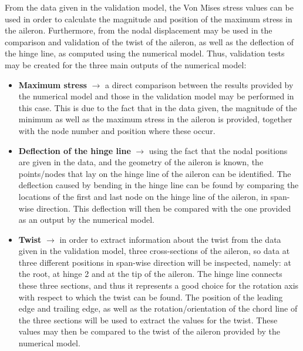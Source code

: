 From the data given in the validation model, the Von Mises stress values can be used in order to calculate the magnitude and position of the maximum stress in the aileron. Furthermore, from the nodal displacement may be used in the comparison and validation of the twist of the aileron, as well as the deflection of the hinge line, as computed using the numerical model. Thus, validation tests may be created for the three main outputs of the numerical model: 
\begin{itemize}
    \item \textbf{Maximum stress} $\rightarrow$ a direct comparison between the results provided by the numerical model and those in the validation model may be performed in this case. This is due to the fact that in the data given, the magnitude of the minimum as well as the maximum stress in the aileron is provided, together with the node number and position where these occur. 
    
    \item \textbf{Deflection of the hinge line} $\rightarrow$ using the fact that the nodal positions are given in the data, and the geometry of the aileron is known, the points/nodes that lay on the hinge line of the aileron can be identified. The deflection caused by bending in the hinge line can be found by comparing the locations of the first and last node on the hinge line of the aileron, in span-wise direction. This deflection will then be compared with the one provided as an output by the numerical model.
    
    \item \textbf{Twist} $\rightarrow$ in order to extract information about the twist from the data given in the validation model, three cross-sections of the aileron, so data at three different positions in span-wise direction will be inspected, namely: at the root, at hinge 2 and at the tip of the aileron. The hinge line connects these three sections, and thus it represents a good choice for the rotation axis with respect to which the twist can be found. The position of the leading edge and trailing edge, as well as the rotation/orientation of the chord line of the three sections will be used to extract the values for the twist. These values may then be compared to the twist of the aileron provided by the numerical model.  
    
\end{itemize}

